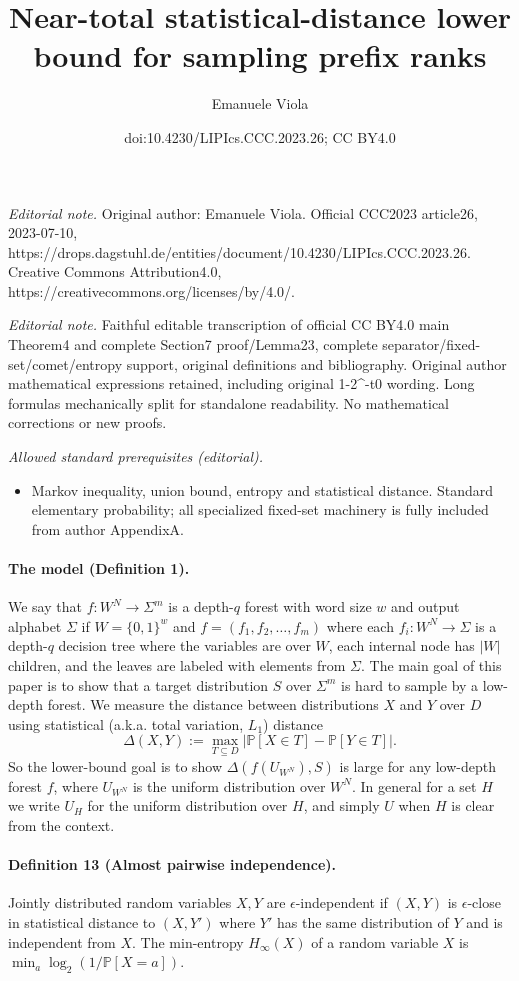 \documentclass[10pt,a4paper]{article}
\title{Near-total statistical-distance lower bound for sampling prefix ranks}
\author{Emanuele Viola}
\date{doi:10.4230/LIPIcs.CCC.2023.26; CC BY4.0}
\begin{document}
\maketitle
\noindent\textit{Editorial note.} Original author: Emanuele Viola. Official CCC2023 article26, 2023-07-10, https://drops.dagstuhl.de/entities/document/10.4230/LIPIcs.CCC.2023.26. Creative Commons Attribution4.0, https://creativecommons.org/licenses/by/4.0/.\par\medskip
\noindent\textit{Editorial note.} Faithful editable transcription of official CC BY4.0 main Theorem4 and complete Section7 proof/Lemma23, complete separator/fixed-set/comet/entropy support, original definitions and bibliography. Original author mathematical expressions retained, including original 1-2\textasciicircum{}-t0 wording. Long formulas mechanically split for standalone readability. No mathematical corrections or new proofs.\par\medskip
\noindent\textit{Allowed standard prerequisites (editorial).}\begin{itemize}
\item Markov inequality, union bound, entropy and statistical distance. Standard elementary probability; all specialized fixed-set machinery is fully included from author AppendixA.
\end{itemize}\medskip
\paragraph{The model (Definition 1).}
We say that $f:W^N\to\Sigma^m$ is a depth-$q$ forest with word size $w$ and output alphabet $\Sigma$ if $W=\{0,1\}^w$ and $f=(f_1,f_2,\ldots,f_m)$ where each $f_i:W^N\to\Sigma$ is a depth-$q$ decision tree where the variables are over $W$, each internal node has $|W|$ children, and the leaves are labeled with elements from $\Sigma$.
The main goal of this paper is to show that a target distribution $S$ over $\Sigma^m$ is hard to sample by a low-depth forest. We measure the distance between distributions $X$ and $Y$ over $D$ using statistical (a.k.a. total variation, $L_1$) distance
\[\Delta(X,Y):=\max_{T\subseteq D}|\mathbb P[X\in T]-\mathbb P[Y\in T]|.\]
So the lower-bound goal is to show $\Delta(f(U_{W^N}),S)$ is large for any low-depth forest $f$, where $U_{W^N}$ is the uniform distribution over $W^N$. In general for a set $H$ we write $U_H$ for the uniform distribution over $H$, and simply $U$ when $H$ is clear from the context.
\paragraph{Definition 13 (Almost pairwise independence).}
Jointly distributed random variables $X,Y$ are $\epsilon$-independent if $(X,Y)$ is $\epsilon$-close in statistical distance to $(X,Y')$ where $Y'$ has the same distribution of $Y$ and is independent from $X$.
The min-entropy $H_\infty(X)$ of a random variable $X$ is $\min_a\log_2(1/\mathbb P[X=a])$.
\end{document}
